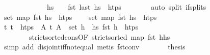 \begin{isabellebody}
\ \ \ \ \ \ \ \ \ \ \ \ \ {\isacartoucheopen}hs\ {\isasymnoteq}\ {\isacharbrackleft}{\kern0pt}{\isacharbrackright}{\kern0pt}\ {\isasymLongrightarrow}\ fst\ {\isacharparenleft}{\kern0pt}last\ hs{\isacharparenright}{\kern0pt}\ {\isasymin}\ htps{\isacartoucheclose}\isanewline
\ \ \ \ \ \ \isamarkupfalse%
\ {\isacharparenleft}{\kern0pt}auto\ split{\isacharcolon}{\kern0pt}\ if{\isacharunderscore}{\kern0pt}splits{\isacharparenright}{\kern0pt}\isanewline
\ \ \ \ \isamarkupfalse%
\ \isamarkupfalse%
\ {\isacartoucheopen}set\ {\isacharparenleft}{\kern0pt}map\ fst\ hs{}{\isacharparenright}{\kern0pt}\ {\isasyminter}\ htps\ {\isacharequal}{\kern0pt}\ {\isacharbraceleft}{\kern0pt}{\isacharbraceright}{\kern0pt}{\isacartoucheclose}\ \isamarkupfalse%
\ {\isachardoublequoteopen}set\ {\isacharparenleft}{\kern0pt}map\ fst\ hs{}{\isacharprime}{\kern0pt}{\isacharparenright}{\kern0pt}\ {\isasyminter}\ htps\ {\isacharequal}{\kern0pt}\ {\isacharbraceleft}{\kern0pt}{\isacharbraceright}{\kern0pt}{\isachardoublequoteclose}\isanewline
\ \ \ \ \ \ \isamarkupfalse%
\ {\isacartoucheopen}{\isasymAnd}t{\isachardot}{\kern0pt}\ t\ {\isasymin}\ htps\ {\isasymLongrightarrow}\ {\isasymexists}A{\isachardot}{\kern0pt}\ {\isacharparenleft}{\kern0pt}t{\isacharcomma}{\kern0pt}\ A{\isacharparenright}{\kern0pt}\ {\isasymin}\ set\ {\isacharparenleft}{\kern0pt}h\ {\isacharhash}{\kern0pt}\ hs{}{\isacharparenright}{\kern0pt}{\isacartoucheclose}\ {\isacartoucheopen}fst\ h{\isacharprime}{\kern0pt}\ {\isasymin}\ htps{\isacartoucheclose}\isanewline
\ \ \ \ \ \ \ \ strict{\isacharunderscore}{\kern0pt}sorted{\isacharunderscore}{\kern0pt}cons{\isacharbrackleft}{\kern0pt}OF\ {\isacartoucheopen}strict{\isacharunderscore}{\kern0pt}sorted\ {\isacharparenleft}{\kern0pt}map\ fst\ {\isacharparenleft}{\kern0pt}h{\isacharprime}{\kern0pt}{\isacharhash}{\kern0pt}hs{}{\isacharprime}{\kern0pt}{\isacharparenright}{\kern0pt}{\isacharparenright}{\kern0pt}{\isacartoucheclose}{\isacharbrackright}{\kern0pt}\isanewline
\ \ \ \ \ \ \isamarkupfalse%
\ {\isacharparenleft}{\kern0pt}simp\ add{\isacharcolon}{\kern0pt}\ disjoint{\isacharunderscore}{\kern0pt}iff{\isacharunderscore}{\kern0pt}not{\isacharunderscore}{\kern0pt}equal{\isacharparenright}{\kern0pt}\ {\isacharparenleft}{\kern0pt}metis\ fst{\isacharunderscore}{\kern0pt}conv{\isacharparenright}{\kern0pt}\isanewline
\ \ \ \ \isamarkupfalse%
\ \isamarkupfalse%
\ {\isacharquery}{\kern0pt}thesis\isanewline

\end{isabellebody}
